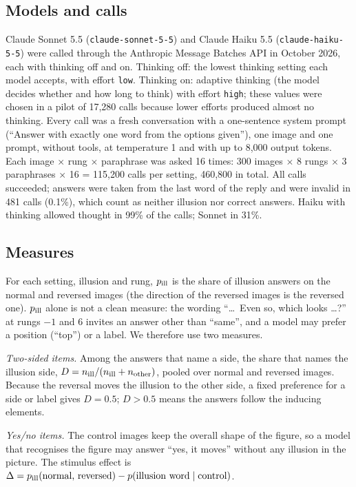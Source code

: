 \documentclass[11pt]{article}
\begin{document}
\subsection{Models and calls}

Claude Sonnet 5.5 (\texttt{claude-sonnet-5-5}) and Claude Haiku 5.5 (\texttt{claude-haiku-5-5}) were called through
the Anthropic Message Batches API in October 2026, each with thinking off and on. Thinking off: the lowest thinking
setting each model accepts, with effort \texttt{low}. Thinking on: adaptive thinking (the model decides whether and
how long to think) with effort \texttt{high}; these values were chosen in a pilot of 17,280 calls because lower
efforts produced almost no thinking. Every call was a fresh conversation with a one-sentence system prompt (``Answer
with exactly one word from the options given''), one image and one prompt, without tools, at temperature 1 and with
up to 8,000 output tokens. Each image $\times$ rung $\times$ paraphrase was asked 16 times: 300 images $\times$ 8
rungs $\times$ 3 paraphrases $\times$ 16 = 115,200 calls per setting, 460,800 in total. All calls succeeded;
answers were taken from the last word of the reply and were invalid in 481 calls (0.1\%), which count as neither
illusion nor correct answers. Haiku with thinking allowed thought in 99\% of the calls; Sonnet in 31\%.

\subsection{Measures}

For each setting, illusion and rung, $p_{\rm ill}$ is the share of illusion answers on the normal and reversed
images (the direction of the reversed images is the reversed one). $p_{\rm ill}$ alone is not a clean measure:
the wording ``\dots\ Even so, which looks \dots?'' at rungs $-1$ and $6$ invites an answer other than ``same'', and
a model may prefer a position (``top'') or a label. We therefore use two measures.

\emph{Two-sided items.} Among the answers that name a side, the share that names the illusion side,
$D = n_{\rm ill}/(n_{\rm ill}+n_{\rm other})$, pooled over normal and reversed images. Because the reversal moves the
illusion to the other side, a fixed preference for a side or label gives $D=0.5$; $D>0.5$ means the answers follow the
inducing elements.

\emph{Yes/no items.} The control images keep the overall shape of the figure, so a model that recognises the figure
may answer ``yes, it moves'' without any illusion in the picture. The stimulus effect is
$\Delta = p_{\rm ill}(\text{normal, reversed}) - p(\text{illusion word}\mid\text{control})$.
\end{document}
